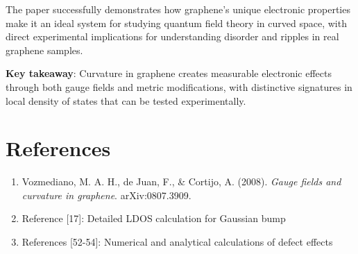 \documentclass[12pt]{article}
\begin{document}
The paper successfully demonstrates how graphene's unique electronic properties make it an ideal system for studying quantum field theory in curved space, with direct experimental implications for understanding disorder and ripples in real graphene samples.

\textbf{Key takeaway}: Curvature in graphene creates measurable electronic effects through both gauge fields and metric modifications, with distinctive signatures in local density of states that can be tested experimentally.

\section*{References}

\begin{enumerate}
    \item Vozmediano, M. A. H., de Juan, F., \& Cortijo, A. (2008). \textit{Gauge fields and curvature in graphene}. arXiv:0807.3909.
    \item Reference [17]: Detailed LDOS calculation for Gaussian bump
    \item References [52-54]: Numerical and analytical calculations of defect effects
\end{enumerate}
\end{document}
